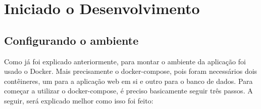  \section{Iniciado o Desenvolvimento}
 
 \subsection{Configurando o ambiente}
 
Como já foi explicado anteriormente, para montar o ambiente da aplicação foi usado o Docker. Mais precisamente o docker-compose, pois foram necessários dois contêineres, um para a aplicação web em si e outro para o banco de dados. Para começar a utilizar o docker-compose, é preciso basicamente seguir três passos. A seguir, será explicado melhor como isso foi feito:

